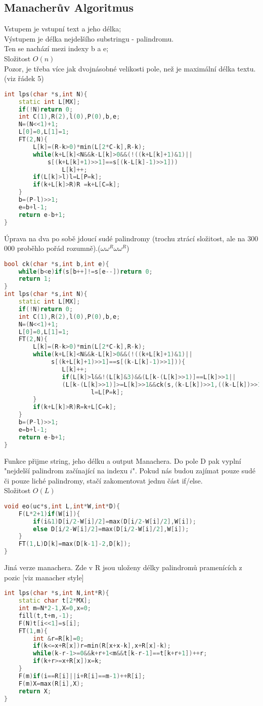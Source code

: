 \documentclass[11pt]{article}
\begin{document}
\subsection{Manacherův Algoritmus}
Vstupem je vstupní text a jeho délka;
\\Výstupem je délka nejdelšího substringu - palindromu.
\\Ten se nachází mezi indexy \textsf{b} a \textsf{e};
\\Složitost $O(n)$
\\Pozor, je třeba více jak dvojnásobné velikosti pole, než je maximální délka textu. (viz řádek 5)
\begin{lstlisting}[language=C++]
int lps(char *s,int N){
    static int L[MX];
    if(!N)return 0;
    int C(1),R(2),l(0),P(0),b,e;
    N=(N<<1)+1;
    L[0]=0,L[1]=1;
    FT(2,N){
        L[k]=(R-k>0)*min(L[2*C-k],R-k);
        while(k+L[k]<N&&k-L[k]>0&&(!((k+L[k]+1)&1)||
            s[(k+L[k]+1)>>1]==s[(k-L[k]-1)>>1]))
                L[k]++;
        if(L[k]>l)l=L[P=k];
        if(k+L[k]>R)R =k+L[C=k];
    }
    b=(P-l)>>1;
    e=b+l-1;
    return e-b+1;
}
\end{lstlisting}
Úprava na dva po sobě jdoucí sudé palindromy (trochu ztrácí složitost, ale na 300 000 proběhlo pořád rozumně).($\omega\omega^R\omega\omega^R$)
\begin{lstlisting}[language=C++]
bool ck(char *s,int b,int e){
    while(b<e)if(s[b++]!=s[e--])return 0;
    return 1;
}
int lps(char *s,int N){
    static int L[MX];
    if(!N)return 0;
    int C(1),R(2),l(0),P(0),b,e;
    N=(N<<1)+1;
    L[0]=0,L[1]=1;
    FT(2,N){
        L[k]=(R-k>0)*min(L[2*C-k],R-k);
        while(k+L[k]<N&&k-L[k]>0&&(!((k+L[k]+1)&1)||
             s[(k+L[k]+1)>>1]==s[(k-L[k]-1)>>1])){
                L[k]++;
                if(L[k]>l&&!(L[k]&3)&&(L[k-(L[k]>>1)]==L[k]>>1||
                (L[k-(L[k]>>1)]>=L[k]>>1&&ck(s,(k-L[k])>>1,((k-L[k])>>1)+(L[k]>>1)-1))))
                        l=L[P=k];
        }
        if(k+L[k]>R)R=k+L[C=k];
    }
    b=(P-l)>>1;
    e=b+l-1;
    return e-b+1;
}
\end{lstlisting}
Funkce přijme string, jeho délku a output Manachera. Do pole \textsf{D} pak vyplní "nejdelší palindrom začínající na indexu $i$". Pokud nás budou zajímat pouze sudé či pouze liché palindromy, stačí zakomentovat jednu část if/else. 
\\Složitost $O(L)$
\begin{lstlisting}[language=C++]
void eo(uc*s,int L,int*W,int*D){
    F(L*2+1)if(W[i]){
        if(i&1)D[i/2-W[i]/2]=max(D[i/2-W[i]/2],W[i]);
        else D[i/2-W[i]/2]=max(D[i/2-W[i]/2],W[i]);
    }
    FT(1,L)D[k]=max(D[k-1]-2,D[k]);
}
\end{lstlisting}
Jiná verze manachera. Zde v \textsf{R} jsou uloženy délky palindromů pramenících z pozic [viz manacher style]
\begin{lstlisting}[language=C++]
int lps(char *s,int N,int*R){
    static char t[2*MX];
    int m=N*2-1,X=0,x=0;
    fill(t,t+m,-1);
    F(N)t[i<<1]=s[i];
    FT(1,m){
        int &r=R[k]=0;
        if(k<=x+R[x])r=min(R[x+x-k],x+R[x]-k);
        while(k-r-1>=0&&k+r+1<m&&t[k-r-1]==t[k+r+1])++r;
        if(k+r>=x+R[x])x=k;
    }
    F(m)if(i==R[i]||i+R[i]==m-1)++R[i];
    F(m)X=max(R[i],X);
    return X;
}
\end{lstlisting}
\end{document}
